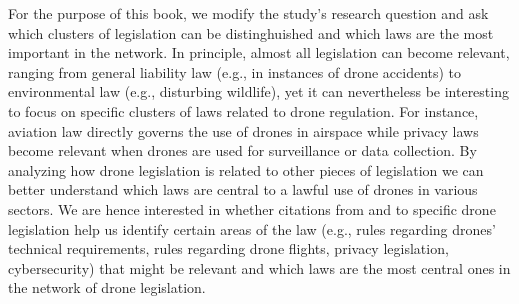 For the purpose of this book, we modify the study's research question
and ask which clusters of legislation can be distinghuished and which
laws are the most important in the network. In principle, almost all
legislation can become relevant, ranging from general liability law
(e.g., in instances of drone accidents) to environmental law (e.g.,
disturbing wildlife), yet it can nevertheless be interesting to focus on
specific clusters of laws related to drone regulation. For instance,
aviation law directly governs the use of drones in airspace while
privacy laws become relevant when drones are used for surveillance or
data collection. By analyzing how drone legislation is related to other
pieces of legislation we can better understand which laws are central to
a lawful use of drones in various sectors. We are hence interested in
whether citations from and to specific drone legislation help us
identify certain areas of the law (e.g., rules regarding drones'
technical requirements, rules regarding drone flights, privacy
legislation, cybersecurity) that might be relevant and which laws are
the most central ones in the network of drone legislation.

    


    
    
    

